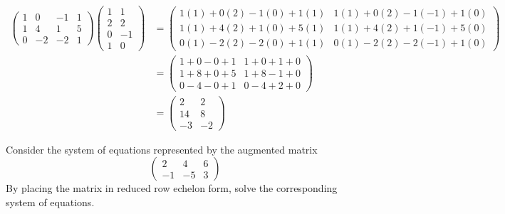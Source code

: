 \documentclass[12pt,letterpaper]{exam}
\begin{document}
\begin{questions}
{\itshape
	\[
	\begin{aligned}
	\begin{pmatrix}
	1 & 0 & -1 & 1 \\
	1 & 4 & 1 & 5 \\
	0 & -2 & -2 & 1 
	\end{pmatrix}
	\begin{pmatrix}
	1 & 1 \\
	2 & 2 \\
	0 & -1 \\
	1 & 0
	\end{pmatrix}&= 
	\begin{pmatrix}
	1(1) + 0(2) - 1(0) + 1(1) & 1(1) + 0(2) - 1(-1) + 1(0) \\
	1(1) + 4(2) + 1(0) + 5(1) & 1(1) + 4(2) + 1(-1) + 5(0) \\
	0(1) - 2(2) - 2(0) + 1(1) & 0(1) - 2(2) - 2(-1) + 1(0) 
	\end{pmatrix} \\[0.3cm]
	&= 
	\begin{pmatrix}
	1 + 0 - 0 + 1 & 1 + 0 + 1 + 0 \\
	1 + 8 + 0 + 5 & 1 + 8 - 1 + 0 \\
	0 - 4 - 0 + 1 & 0 - 4 + 2 + 0 
	\end{pmatrix} \\[0.3cm]
	&= 
	\begin{pmatrix}
	2 & 2 \\
	14 & 8 \\
	-3 & -2
	\end{pmatrix}
	\end{aligned}
	\]
}



\newpage
\question[10] Consider the system of equations represented by the augmented matrix
	\[
	\begin{pmatrix}
	2 & 4 & 6 \\
	-1 & -5 & 3
	\end{pmatrix}
	\]
By placing the matrix in reduced row echelon form, solve the corresponding system of equations. \pspace


\end{questions}
\end{document}
